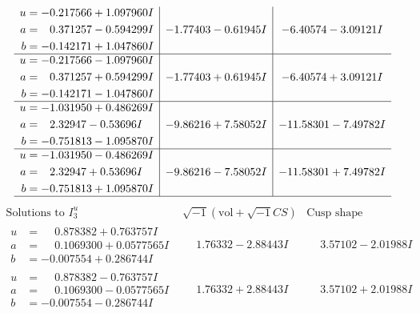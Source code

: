\documentclass[1p]{elsarticle_modified}
\theoremstyle{definition}
\newcommand{\I}{\sqrt{-1}}
\begin{document}
$$\begin{array}{c|c|c}
\begin{aligned}
u &= -0.217566 + 1.097960 I \\
a &= \phantom{-}0.371257 - 0.594299 I \\
b &= -0.142171 + 1.047860 I\end{aligned}
 & -1.77403 - 0.61945 I & -6.40574 - 3.09121 I \\ \hline\begin{aligned}
u &= -0.217566 - 1.097960 I \\
a &= \phantom{-}0.371257 + 0.594299 I \\
b &= -0.142171 - 1.047860 I\end{aligned}
 & -1.77403 + 0.61945 I & -6.40574 + 3.09121 I \\ \hline\begin{aligned}
u &= -1.031950 + 0.486269 I \\
a &= \phantom{-}2.32947 - 0.53696 I \\
b &= -0.751813 - 1.095870 I\end{aligned}
 & -9.86216 + 7.58052 I & -11.58301 - 7.49782 I \\ \hline\begin{aligned}
u &= -1.031950 - 0.486269 I \\
a &= \phantom{-}2.32947 + 0.53696 I \\
b &= -0.751813 + 1.095870 I\end{aligned}
 & -9.86216 - 7.58052 I & -11.58301 + 7.49782 I\\
 \hline 
 \end{array}$$\newpage$$\begin{array}{c|c|c}  
\text{Solutions to }I^u_{3}& \I (\text{vol} + \sqrt{-1}CS) & \text{Cusp shape}\\
 \hline 
\begin{aligned}
u &= \phantom{-}0.878382 + 0.763757 I \\
a &= \phantom{-}0.1069300 + 0.0577565 I \\
b &= -0.007554 + 0.286744 I\end{aligned}
 & \phantom{-}1.76332 - 2.88443 I & \phantom{-}3.57102 - 2.01988 I \\ \hline\begin{aligned}
u &= \phantom{-}0.878382 - 0.763757 I \\
a &= \phantom{-}0.1069300 - 0.0577565 I \\
b &= -0.007554 - 0.286744 I\end{aligned}
 & \phantom{-}1.76332 + 2.88443 I & \phantom{-}3.57102 + 2.01988 I \\ \hline\begin{aligned}

\end{aligned}
\end{array}$$
\end{document}
